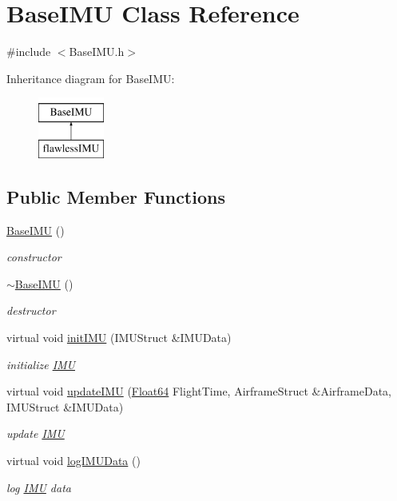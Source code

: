 \hypertarget{class_base_i_m_u}{}\section{Base\+I\+MU Class Reference}
\label{class_base_i_m_u}


{\ttfamily \#include $<$Base\+I\+M\+U.\+h$>$}

Inheritance diagram for Base\+I\+MU\+:\begin{figure}[H]
\begin{center}
\leavevmode
\includegraphics[height=2.000000cm]{class_base_i_m_u}
\end{center}
\end{figure}
\subsection*{Public Member Functions}
\begin{DoxyCompactItemize}
\item 
\hyperlink{class_base_i_m_u_a83201acc90b4dad87a64f0196ec9e282}{Base\+I\+MU} ()
\begin{DoxyCompactList}\small\item\em constructor \end{DoxyCompactList}\item 
\hyperlink{class_base_i_m_u_ae986c3e646b24fc8d58faf6ae72e3841}{$\sim$\+Base\+I\+MU} ()
\begin{DoxyCompactList}\small\item\em destructor \end{DoxyCompactList}\item 
virtual void \hyperlink{class_base_i_m_u_ade02045afd03f290ac1e702db9e1d5a7}{init\+I\+MU} (I\+M\+U\+Struct \&I\+M\+U\+Data)
\begin{DoxyCompactList}\small\item\em initialize \hyperlink{class_i_m_u}{I\+MU} \end{DoxyCompactList}\item 
virtual void \hyperlink{class_base_i_m_u_abd0f60caf589832c53e185c80ce89f3c}{update\+I\+MU} (\hyperlink{group___tools_ga3f1431cb9f76da10f59246d1d743dc2c}{Float64} Flight\+Time, Airframe\+Struct \&Airframe\+Data, I\+M\+U\+Struct \&I\+M\+U\+Data)
\begin{DoxyCompactList}\small\item\em update \hyperlink{class_i_m_u}{I\+MU} \end{DoxyCompactList}\item 
virtual void \hyperlink{class_base_i_m_u_a8f323eb821f92300af5047ed9c66b116}{log\+I\+M\+U\+Data} ()
\begin{DoxyCompactList}\small\item\em log \hyperlink{class_i_m_u}{I\+MU} data \end{DoxyCompactList}\end{DoxyCompactItemize}


